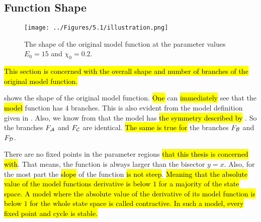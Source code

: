 \subsection{Function Shape}

\begin{figure}
	\centering
	\texttt{[image: ../Figures/5.1/illustration.png]}
	\caption[Shape of the original model function]{
		The shape of the original model function at the parameter values $E_0 = 15$ and $\chi_0 = 0.2$.
	}
	\label{fig:setup.char.shape}
\end{figure}

\hl{
	This section is concerned with the overall shape and number of branches of the original model function.
}

 shows the shape of the original model function.
\hl{One} can \hl{immediately} see that the \hl{model} function has 4 branches.
This is also evident from the model definition given in .
Also, we know from  that the model has \hl{the symmetry described by} .
So the branches $F_{\mathcal{A}}$ and $F_{\mathcal{C}}$ are identical.
\hl{The same is true for} the branches $F_{\mathcal{B}}$ and $F_{\mathcal{D}}$.

There are no fixed points in the parameter regions \hl{that this thesis is concerned with}.
That means, the function is always larger than the bisector $y=x$.
Also, for the most part the \hl{slope} of the function \hl{is not steep}.
\hl{
	Meaning that the absolute value of the model functions derivative is below $1$ for a majority of the state space.
	A model where the absolute value of the derivative of its model function is below $1$ for the whole state space is called contractive.
	In such a model, every fixed point and cycle is stable.
}
